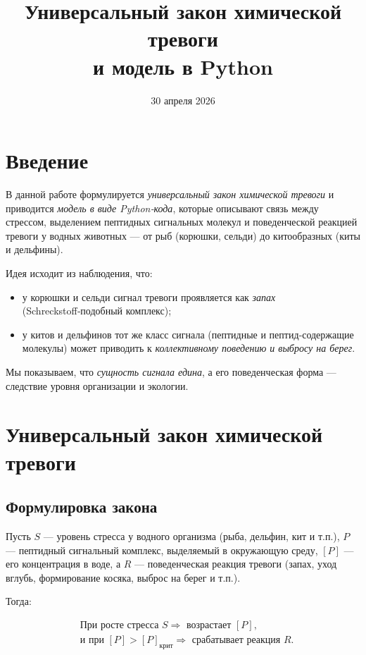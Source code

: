 \documentclass[12pt]{article}
\title{Универсальный закон химической тревоги \\ и модель в Python}
\author{}
\date{30 апреля 2026}
\begin{document}
\maketitle

\tableofcontents
\newpage

\section{Введение}

В данной работе формулируется \emph{универсальный закон химической тревоги} и приводится \emph{модель в виде Python‑кода}, которые описывают связь между стрессом, выделением пептидных сигнальных молекул и поведенческой реакцией тревоги у водных животных — от рыб (корюшки, сельди) до китообразных (киты и дельфины).

Идея исходит из наблюдения, что:
\begin{itemize}
  \item у корюшки и сельди сигнал тревоги проявляется как \emph{запах} (Schreckstoff‑подобный комплекс);
  \item у китов и дельфинов тот же класс сигнала (пептидные и пептид‑содержащие молекулы) может приводить к \emph{коллективному поведению и выбросу на берег}.
\end{itemize}

Мы показываем, что \emph{сущность сигнала едина}, а его поведенческая форма — следствие уровня организации и экологии.

\section{Универсальный закон химической тревоги}

\subsection{Формулировка закона}

Пусть $S$ — уровень стресса у водного организма (рыба, дельфин, кит и т.п.),  
$P$ — пептидный сигнальный комплекс, выделяемый в окружающую среду,  
$[P]$ — его концентрация в воде,  
а $R$ — поведенческая реакция тревоги (запах, уход вглубь, формирование косяка, выброс на берег и т.п.).

Тогда:

\begin{equation}
\begin{aligned}
&\text{При росте стресса } S \Rightarrow \text{ возрастает } [P], \\
&\text{и при } [P] > [P]_{\text{крит}} \Rightarrow \text{ срабатывает реакция } R.
\end{aligned}
\end{equation}
\end{document}

